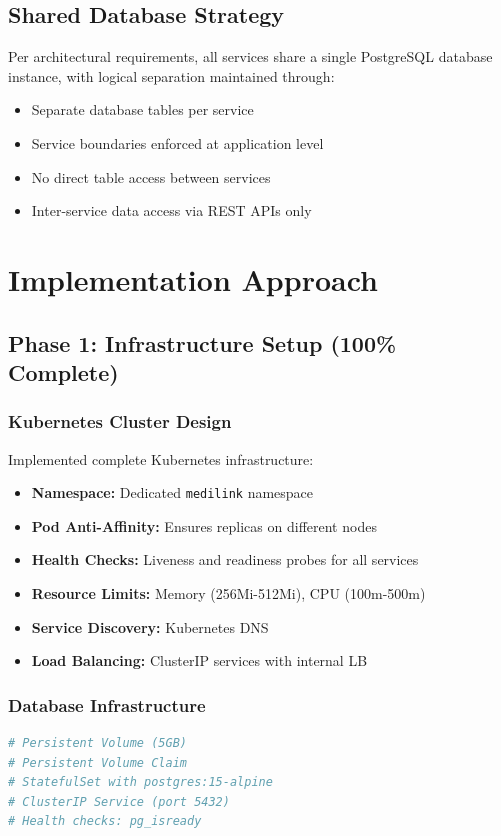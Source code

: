\documentclass[12pt,a4paper]{article}
\begin{document}
\subsection{Shared Database Strategy}
Per architectural requirements, all services share a single PostgreSQL database instance, with logical separation maintained through:
\begin{itemize}
    \item Separate database tables per service
    \item Service boundaries enforced at application level
    \item No direct table access between services
    \item Inter-service data access via REST APIs only
\end{itemize}

\section{Implementation Approach}

\subsection{Phase 1: Infrastructure Setup (100\% Complete)}

\subsubsection{Kubernetes Cluster Design}
Implemented complete Kubernetes infrastructure:
\begin{itemize}
    \item \textbf{Namespace:} Dedicated \texttt{medilink} namespace
    \item \textbf{Pod Anti-Affinity:} Ensures replicas on different nodes
    \item \textbf{Health Checks:} Liveness and readiness probes for all services
    \item \textbf{Resource Limits:} Memory (256Mi-512Mi), CPU (100m-500m)
    \item \textbf{Service Discovery:} Kubernetes DNS
    \item \textbf{Load Balancing:} ClusterIP services with internal LB
\end{itemize}

\subsubsection{Database Infrastructure}
\begin{lstlisting}[language=bash,caption={PostgreSQL Kubernetes Deployment}]
# Persistent Volume (5GB)
# Persistent Volume Claim
# StatefulSet with postgres:15-alpine
# ClusterIP Service (port 5432)
# Health checks: pg_isready
\end{lstlisting}
\end{document}
